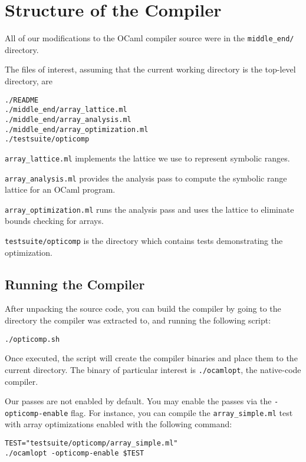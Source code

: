 \documentclass[11pt]{article}
\begin{document}
\section{Structure of the Compiler}

All of our modifications to the OCaml compiler source were in the \verb|middle_end/| directory.

The files of interest, assuming that the current working directory is the top-level directory, are

\begin{verbatim}
./README
./middle_end/array_lattice.ml
./middle_end/array_analysis.ml
./middle_end/array_optimization.ml
./testsuite/opticomp
\end{verbatim}

\verb|array_lattice.ml| implements the lattice we use to represent symbolic ranges.

\verb|array_analysis.ml| provides the analysis pass to compute the symbolic range lattice for an OCaml program.

\verb|array_optimization.ml| runs the analysis pass and uses the lattice to eliminate bounds checking for arrays.

\verb|testsuite/opticomp| is the directory which contains tests demonstrating the optimization.

\subsection{Running the Compiler}

After unpacking the source code, you can build the compiler by going to the directory the compiler was extracted to, and running the following script:

\begin{verbatim}
./opticomp.sh
\end{verbatim}

Once executed, the script will create the compiler binaries and place them to the current directory. The binary of particular interest is \verb|./ocamlopt|, the native-code compiler.

Our passes are not enabled by default. You may enable the passes via the \verb|-opticomp-enable| flag. For instance, you can compile the \verb|array_simple.ml| test with array optimizations enabled with the following command:

\begin{verbatim}
TEST="testsuite/opticomp/array_simple.ml"
./ocamlopt -opticomp-enable $TEST
\end{verbatim}
\end{document}
